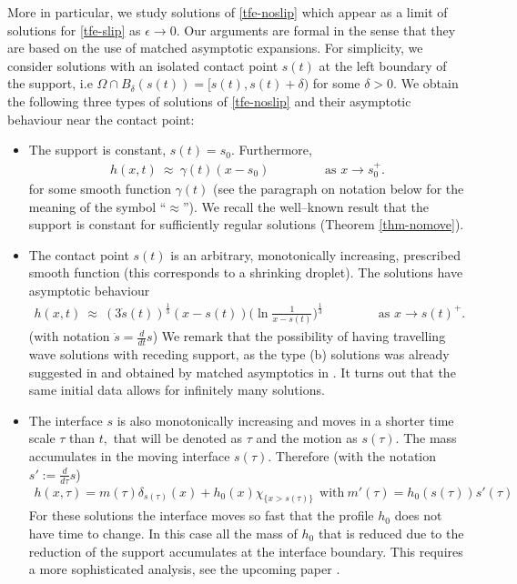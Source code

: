 \documentclass[pagesize,pdftex]{amsart}
\renewcommand{\d}{\delta}
\newcommand{\gam}{\gamma}
\newcommand{\eps}{\epsilon}
\newcommand{\Ome}{\Omega}
\begin{document}
More in particular, we study solutions of \eqref{tfe-noslip} which appear as a
limit of solutions for \eqref{tfe-slip} as $\eps \to 0$. Our arguments are
formal in the sense that they are based on the use of matched asymptotic
expansions.  For simplicity, we consider solutions with an isolated contact
point $s(t)$ at the left boundary of the support, i.e
$\Ome \cap B_{\d}(s(t)) = [s(t), s(t) + \d)$ for some $\d >
0$. We obtain the following three types of solutions of \eqref{tfe-noslip} and
their asymptotic behaviour near the contact point:
\begin{itemize}
\item[(a)] \label{Typea} %
  The support is constant, $s(t)= s_{0}$. Furthermore, 
\begin{align} \label{S1E4} %
  h(x,t) \ \approx \ \gam(t) \left(x-s_{0}\right) \qquad\qquad %
  \text{ as $x \to  s_0^+$}. 
\end{align}%
for some smooth function $\gam(t)$ (see the paragraph on notation below
for the meaning of the symbol ``$\approx$''). We recall the well--known result
that the support is constant for sufficiently regular solutions (Theorem
\ref{thm-nomove}).
\end{itemize}
\begin{itemize}
\item[(b)] \label{Typeb} %
  The contact point $s(t)$ is an arbitrary, monotonically increasing,
  prescribed smooth function (this corresponds to a shrinking droplet). The
  solutions have asymptotic behaviour %
  \begin{align}
    h(x,t) \ %
    \approx \ (3 \dot s(t))^{\frac 13}\left(x-s(t) \right) \Big(\ln \frac{1}{
    x-s(t)} \Big)^{\frac 13} \qquad\qquad %
    \text{ as $x \to  s(t)^+$}.  \label{def-typeb}
  \end{align}
  (with notation $\dot s = \frac d{dt} s$) We remark that the possibility of
  having travelling wave solutions with receding support, as the type (b)
  solutions was already suggested in \cite{BoattoEtal-1993} and obtained by
  matched asymptotics in \cite{BowenKing-2001}. It turns out that the same
  initial data allows for infinitely many solutions.
\end{itemize}
\begin{itemize}
\item[(c)] \label{Typec} %
  The interface $s$ is also monotonically increasing and moves in a shorter
  time scale $\tau$ than $t,$ that will be denoted as $\tau $ and the motion as
  $s\left(\tau \right)$. The mass accumulates in the moving interface
  $s(\tau)$. Therefore (with the notation $s' := \frac{d}{d\tau}s$) %
\begin{align}
  h(x,\tau) =m(\tau) \delta_{s(\tau)}(x) +h_{0}(x) \chi_{\{ x>s\left(\tau
  \right)\} }  \ \  %
  \text{with} \ m'(\tau) = h_{0}(s(\tau)) s'(\tau)
\label{def-typec}
\end{align}
For these solutions the interface moves so fast that the profile $h_{0}$ does
not have time to change. In this case all the mass of $%
h_{0}$ that is reduced due to the reduction of the support accumulates at the
interface boundary. This requires a more sophisticated analysis, see the
upcoming paper \cite{paper2}.
\end{itemize}
\end{document}
